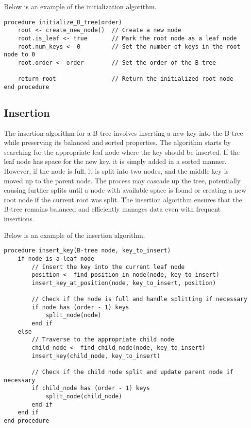 \begin{highlight}

Below is an example of the initialization algorithm.

\horizontalline

\begin{verbatim}
procedure initialize_B_tree(order)
    root <- create_new_node()  // Create a new node
    root.is_leaf <- true       // Mark the root node as a leaf node
    root.num_keys <- 0         // Set the number of keys in the root node to 0
    root.order <- order        // Set the order of the B-tree

    return root                // Return the initialized root node
end procedure
\end{verbatim}
    
\end{highlight}

\subsection*{Insertion}

The insertion algorithm for a B-tree involves inserting a new key into the B-tree while preserving its balanced and sorted properties. The algorithm starts by searching for the appropriate leaf node where the 
key should be inserted. If the leaf node has space for the new key, it is simply added in a sorted manner. However, if the node is full, it is split into two nodes, and the middle key is moved up to the parent 
node. The process may cascade up the tree, potentially causing further splits until a node with available space is found or creating a new root node if the current root was split. The insertion algorithm 
ensures that the B-tree remains balanced and efficiently manages data even with frequent insertions.

\begin{highlight}

Below is an example of the insertion algorithm.

\horizontalline

\begin{verbatim}
procedure insert_key(B-tree node, key_to_insert)
    if node is a leaf node
        // Insert the key into the current leaf node
        position <- find_position_in_node(node, key_to_insert)
        insert_key_at_position(node, key_to_insert, position)

        // Check if the node is full and handle splitting if necessary
        if node has (order - 1) keys
            split_node(node)
        end if
    else
        // Traverse to the appropriate child node
        child_node <- find_child_node(node, key_to_insert)
        insert_key(child_node, key_to_insert)

        // Check if the child node split and update parent node if necessary
        if child_node has (order - 1) keys
            split_node(child_node)
        end if
    end if
end procedure
\end{verbatim}

\end{highlight}

